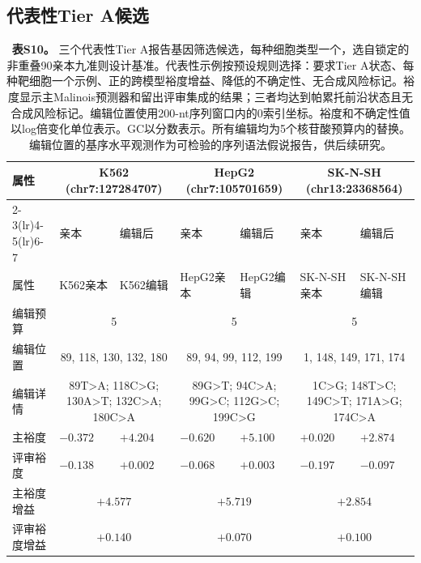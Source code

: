 \documentclass[10pt,a4paper]{article}
\begin{document}
\subsection{代表性Tier A候选}

\begin{landscape}
\begin{longtable}{p{2.2cm}p{2.0cm}p{2.0cm}p{2.0cm}p{2.0cm}p{2.0cm}p{2.0cm}}
\caption{\textbf{表S10。} 三个代表性Tier A报告基因筛选候选，每种细胞类型一个，选自锁定的非重叠90亲本九准则设计基准。代表性示例按预设规则选择：要求Tier A状态、每种靶细胞一个示例、正的跨模型裕度增益、降低的不确定性、无合成风险标记。裕度显示主Malinois预测器和留出评审集成的结果；三者均达到帕累托前沿状态且无合成风险标记。编辑位置使用200-nt序列窗口内的0索引坐标。裕度和不确定性值以log倍变化单位表示。GC以分数表示。所有编辑均为5个核苷酸预算内的替换。编辑位置的基序水平观测作为可检验的序列语法假说报告，供后续研究。}\label{tab:S10}\\
\toprule
属性 & \multicolumn{2}{c}{K562 (chr7:127284707)} & \multicolumn{2}{c}{HepG2 (chr7:105701659)} & \multicolumn{2}{c}{SK-N-SH (chr13:23368564)} \\
\cmidrule(lr){2-3}\cmidrule(lr){4-5}\cmidrule(lr){6-7}
& 亲本 & 编辑后 & 亲本 & 编辑后 & 亲本 & 编辑后 \\
\midrule
\endfirsthead
\toprule
属性 & K562亲本 & K562编辑 & HepG2亲本 & HepG2编辑 & SK-N-SH亲本 & SK-N-SH编辑 \\
\midrule
\endhead
编辑预算 & \multicolumn{2}{c}{5} & \multicolumn{2}{c}{5} & \multicolumn{2}{c}{5} \\
编辑位置 & \multicolumn{2}{c}{\small 89, 118, 130, 132, 180} & \multicolumn{2}{c}{\small 89, 94, 99, 112, 199} & \multicolumn{2}{c}{\small 1, 148, 149, 171, 174} \\
编辑详情 & \multicolumn{2}{c}{\small 89T>A; 118C>G; 130A>T; 132C>A; 180C>A} & \multicolumn{2}{c}{\small 89G>T; 94C>A; 99G>C; 112G>C; 199C>G} & \multicolumn{2}{c}{\small 1C>G; 148T>C; 149C>T; 171A>G; 174C>A} \\
\addlinespace
主裕度 & $-0.372$ & $+4.204$ & $-0.620$ & $+5.100$ & $+0.020$ & $+2.874$ \\
评审裕度 & $-0.138$ & $+0.002$ & $-0.068$ & $+0.003$ & $-0.197$ & $-0.097$ \\
主裕度增益 & \multicolumn{2}{c}{$+4.577$} & \multicolumn{2}{c}{$+5.719$} & \multicolumn{2}{c}{$+2.854$} \\
评审裕度增益 & \multicolumn{2}{c}{$+0.140$} & \multicolumn{2}{c}{$+0.070$} & \multicolumn{2}{c}{$+0.100$} \\

\end{longtable}
\end{landscape}
\end{document}
